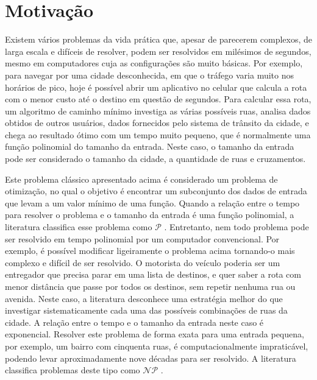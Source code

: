 \section{Motivação}

Existem vários problemas da vida prática que, apesar de parecerem complexos, de larga escala e difíceis de resolver, podem ser resolvidos em milésimos de segundos, mesmo em computadores cuja as configurações são muito básicas. Por exemplo, para navegar por uma cidade desconhecida, em que o tráfego varia muito nos horários de pico, hoje é possível abrir um aplicativo no celular que calcula a rota com o menor custo até o destino em questão de segundos. Para calcular essa rota, um algoritmo de caminho mínimo \cite{xu2007} investiga as várias possíveis ruas, analisa dados obtidos de outros usuários, dados fornecidos pelo sistema de trânsito da cidade, e chega ao resultado ótimo com um tempo muito pequeno, que é normalmente uma função polinomial do tamanho da entrada. Neste caso, o tamanho da entrada pode ser considerado o tamanho da cidade, a quantidade de ruas e cruzamentos. 

Este problema clássico apresentado acima é considerado um problema de otimização, no qual o objetivo é encontrar um subconjunto dos dados de entrada que levam a um valor mínimo de uma função. Quando a relação entre o tempo para resolver o problema e o tamanho da entrada é uma função polinomial, a literatura classifica esse problema como $\mathcal{P}$ \cite{karp1972}. Entretanto, nem todo problema pode ser resolvido em tempo polinomial por um computador convencional. Por exemplo, é possível modificar ligeiramente o problema acima tornando-o mais complexo e difícil de ser resolvido. O motorista do veículo poderia ser um entregador que precisa parar em uma lista de destinos, e quer saber a rota com menor distância que passe por todos os destinos, sem repetir nenhuma rua ou avenida. Neste caso, a literatura desconhece uma estratégia melhor do que investigar sistematicamente cada uma das possíveis combinações de ruas da cidade. A relação entre o tempo e o tamanho da entrada neste caso é exponencial. Resolver este problema de forma exata para uma entrada pequena, por exemplo, um bairro com cinquenta ruas, é computacionalmente impraticável, podendo levar aproximadamente nove décadas para ser resolvido. A literatura classifica problemas deste tipo como $\mathcal{NP}$ \cite{li2015}.

